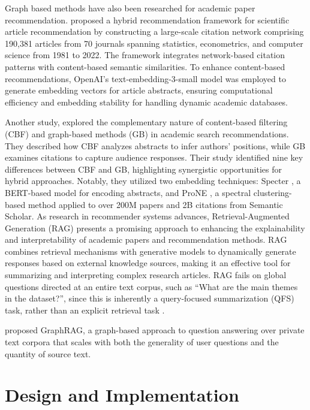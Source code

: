 \documentclass[a4paper,12pt]{article}
\begin{document}
Graph based methods have also been researched for academic paper recommendation.
\parencite{liu2025academicliteraturerecommendationlargescale} proposed a hybrid
recommendation framework for scientific article recommendation by constructing a
large-scale citation network comprising 190,381 articles from 70 journals spanning
statistics, econometrics, and computer science from 1981 to 2022. The framework
integrates network-based citation patterns with content-based semantic similarities.
To enhance content-based recommendations, OpenAI’s text-embedding-3-small model was
employed to generate embedding vectors for article abstracts, ensuring computational
efficiency and embedding stability for handling dynamic academic databases.

Another study, \parencite{church2024academicarticlerecommendationusing} explored the
complementary nature of content-based filtering (CBF) and graph-based methods (GB)
in academic search recommendations. They described how CBF analyzes abstracts to
infer authors’ positions, while GB examines citations to capture audience responses.
Their study identified nine key differences between CBF and GB, highlighting
synergistic opportunities for hybrid approaches. Notably, they utilized two
embedding techniques: Specter
\parencite{cohan-etal-2020-specter}, a BERT-based model
for encoding abstracts, and ProNE \parencite{zhang2019prone}, a spectral clustering-based method applied to
over 200M papers and 2B citations from Semantic Scholar.
As research in recommender systems advances, Retrieval-Augmented Generation (RAG)
presents a promising approach to enhancing the explainability and interpretability
of academic papers and recommendation methods. RAG combines retrieval mechanisms
with generative models to dynamically generate responses based on external knowledge
sources, making it an effective tool for summarizing and interpreting complex
research articles. RAG fails on global questions directed at an entire text corpus,
such as “What are the main themes in the dataset?”, since this is inherently a
query-focused summarization (QFS) task, rather than an explicit retrieval task
\parencite{edge2025localglobalgraphrag}.

\parencite{edge2025localglobalgraphrag} proposed GraphRAG, a graph-based approach
to question answering over private text corpora that scales with both the generality
of user questions and the quantity of source text.
\newpage

\section{Design and Implementation}
\end{document}
